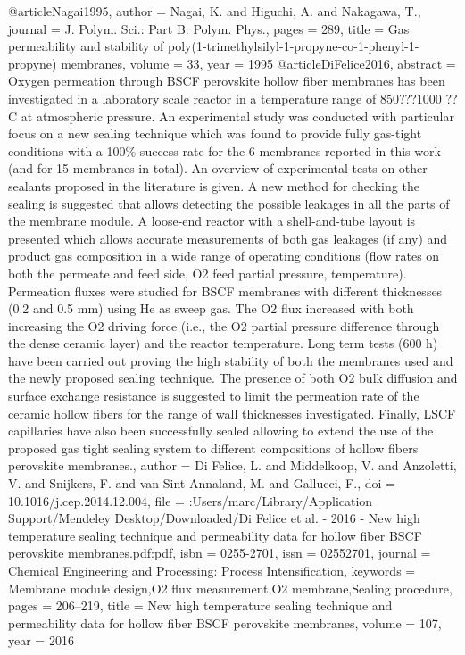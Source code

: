 @article{Nagai1995,
author = {Nagai, K. and Higuchi, A. and Nakagawa, T.},
journal = {J. Polym. Sci.: Part B: Polym. Phys.},
pages = {289},
title = {{Gas permeability and stability of poly(1-trimethylsilyl-1-propyne-co-1-phenyl-1-propyne) membranes}},
volume = {33},
year = {1995}
}
@article{DiFelice2016,
abstract = {Oxygen permeation through BSCF perovskite hollow fiber membranes has been investigated in a laboratory scale reactor in a temperature range of 850???1000 ??C at atmospheric pressure. An experimental study was conducted with particular focus on a new sealing technique which was found to provide fully gas-tight conditions with a 100{\%} success rate for the 6 membranes reported in this work (and for 15 membranes in total). An overview of experimental tests on other sealants proposed in the literature is given. A new method for checking the sealing is suggested that allows detecting the possible leakages in all the parts of the membrane module. A loose-end reactor with a shell-and-tube layout is presented which allows accurate measurements of both gas leakages (if any) and product gas composition in a wide range of operating conditions (flow rates on both the permeate and feed side, O2 feed partial pressure, temperature). Permeation fluxes were studied for BSCF membranes with different thicknesses (0.2 and 0.5 mm) using He as sweep gas. The O2 flux increased with both increasing the O2 driving force (i.e., the O2 partial pressure difference through the dense ceramic layer) and the reactor temperature. Long term tests (600 h) have been carried out proving the high stability of both the membranes used and the newly proposed sealing technique. The presence of both O2 bulk diffusion and surface exchange resistance is suggested to limit the permeation rate of the ceramic hollow fibers for the range of wall thicknesses investigated. Finally, LSCF capillaries have also been successfully sealed allowing to extend the use of the proposed gas tight sealing system to different compositions of hollow fibers perovskite membranes.},
author = {{Di Felice}, L. and Middelkoop, V. and Anzoletti, V. and Snijkers, F. and {van Sint Annaland}, M. and Gallucci, F.},
doi = {10.1016/j.cep.2014.12.004},
file = {:Users/marc/Library/Application Support/Mendeley Desktop/Downloaded/Di Felice et al. - 2016 - New high temperature sealing technique and permeability data for hollow fiber BSCF perovskite membranes.pdf:pdf},
isbn = {0255-2701},
issn = {02552701},
journal = {Chemical Engineering and Processing: Process Intensification},
keywords = {Membrane module design,O2 flux measurement,O2 membrane,Sealing procedure},
pages = {206--219},
title = {{New high temperature sealing technique and permeability data for hollow fiber BSCF perovskite membranes}},
volume = {107},
year = {2016}
}
